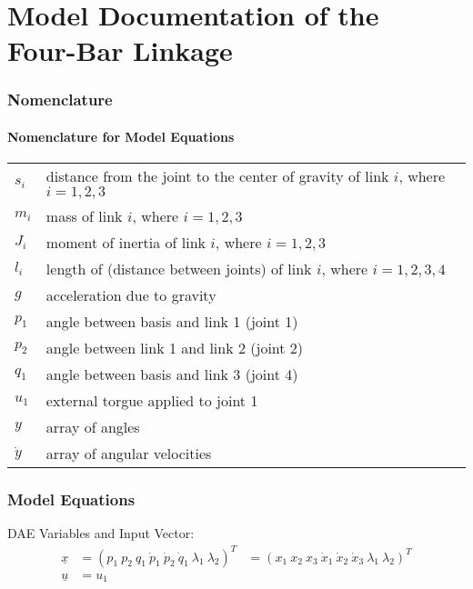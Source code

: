 \documentclass[10pt,a4paper]{article}
\begin{document}
	\part*{Model Documentation of the \\ Four-Bar Linkage} %
	
	
	\section{Nomenclature} %
	\subsection{Nomenclature for Model Equations} %
	
	\begin{tabular}{ll}
		$s_i$ & distance from the joint to the center of gravity of link $i$, where $i = 1,2,3$ \\
		$m_i$ & mass of link $i$, where $i = 1,2,3$ \\
		$J_i$ & moment of inertia of link $i$, where $i = 1,2,3$ \\
		$l_i$ & length of (distance between joints) of link $i$, where $i = 1,2,3,4$ \\
		$g$ & acceleration due to gravity\\
		$p_1$ & angle between basis and link 1 (joint 1)\\
		$p_2$ & angle between link 1 and link 2 (joint 2)\\
		$q_1$ & angle between basis and link 3 (joint 4)\\
		$u_1$ & external torgue applied to joint 1\\
		$y$ & array of angles\\
		$\dot{y}$ & array of angular velocities\\			
	\end{tabular}
	 

	
	
	\section{Model Equations} %
	
	DAE Variables and Input Vector:
	\begin{align*}
		\underline{x} &= (p_1 \ p_2 \ q_1 \ \dot{p}_1 \ \dot{p}_2 \ \dot{q}_1 \ \lambda_1 \ \lambda_2)^T &= (x_1 \ x_2 \ x_3 \ \dot{x}_1 \ \dot{x}_2 \ \dot{x}_3 \ \lambda_1 \ \lambda_2)^T \\
		\underline{u} &= u_1
	\end{align*}
	
\end{document}
